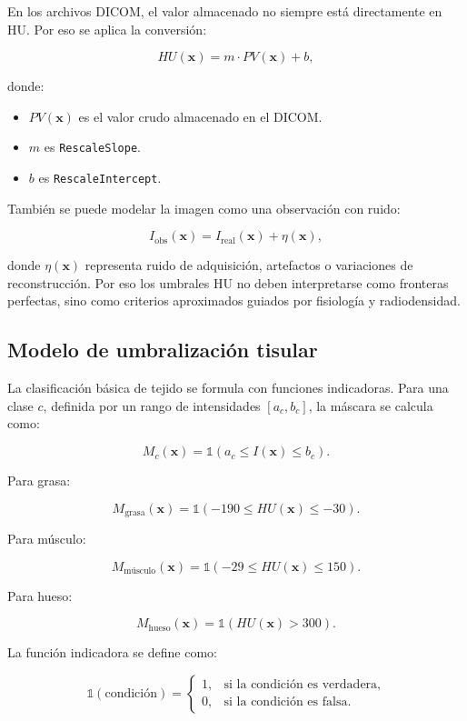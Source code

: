 \documentclass[12pt,a4paper]{article}
\begin{document}
En los archivos DICOM, el valor almacenado no siempre está directamente en HU. Por eso se aplica la conversión:

\[
HU(\mathbf{x}) =
m\cdot PV(\mathbf{x}) + b,
\]

donde:

\begin{itemize}
    \item \(PV(\mathbf{x})\) es el valor crudo almacenado en el DICOM.
    \item \(m\) es \texttt{RescaleSlope}.
    \item \(b\) es \texttt{RescaleIntercept}.
\end{itemize}

También se puede modelar la imagen como una observación con ruido:

\[
I_{\text{obs}}(\mathbf{x})
=
I_{\text{real}}(\mathbf{x})
+
\eta(\mathbf{x}),
\]

donde \(\eta(\mathbf{x})\) representa ruido de adquisición, artefactos o variaciones de reconstrucción. Por eso los umbrales HU no deben interpretarse como fronteras perfectas, sino como criterios aproximados guiados por fisiología y radiodensidad.

\subsection{Modelo de umbralización tisular}

La clasificación básica de tejido se formula con funciones indicadoras. Para una clase \(c\), definida por un rango de intensidades \([a_c,b_c]\), la máscara se calcula como:

\[
M_c(\mathbf{x})
=
\mathbb{1}
\left(
a_c \leq I(\mathbf{x}) \leq b_c
\right).
\]

Para grasa:

\[
M_{\text{grasa}}(\mathbf{x})
=
\mathbb{1}
\left(
-190 \leq HU(\mathbf{x}) \leq -30
\right).
\]

Para músculo:

\[
M_{\text{músculo}}(\mathbf{x})
=
\mathbb{1}
\left(
-29 \leq HU(\mathbf{x}) \leq 150
\right).
\]

Para hueso:

\[
M_{\text{hueso}}(\mathbf{x})
=
\mathbb{1}
\left(
HU(\mathbf{x}) > 300
\right).
\]

La función indicadora se define como:

\[
\mathbb{1}(\text{condición})
=
\begin{cases}
1, & \text{si la condición es verdadera},\\
0, & \text{si la condición es falsa}.
\end{cases}
\]
\end{document}
